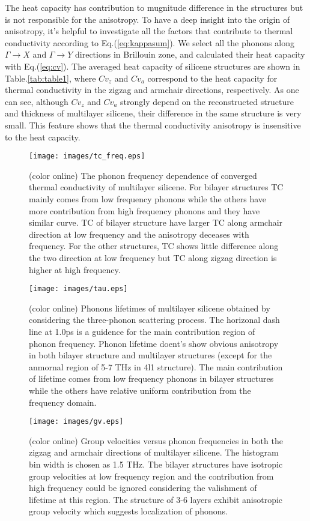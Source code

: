 \documentclass[aps,prb,twocolumn,showpacs,amsmath,amssymb]{revtex4-1}
\begin{document}
The heat capacity has contribution to mugnitude difference in the structures but is not responsible for the anisotropy. To have a deep insight into the origin of anisotropy, it's helpful to investigate all the factors that contribute to thermal conductivity according to Eq.(\ref{eq:kappasum}).
We select all the phonons along  $\Gamma\rightarrow X$ and $\Gamma \rightarrow Y$ directions in Brillouin zone, and calculated their heat capacity with Eq.(\ref{eq:cv}). The averaged heat capacity of silicene structures are shown in Table.\ref{tab:table1}, where $Cv_z$ and $Cv_a$ correspond to the  heat capacity for thermal conductivity in the zigzag and armchair directions, respectively.  As one can see, although $Cv_z$ and $Cv_a$  strongly depend on the reconstructed structure and thickness of multilayer silicene, their difference in the same structure is very small. This feature shows that the thermal conductivity anisotropy is insensitive to the heat capacity.


\begin{figure}[b]
  \texttt{[image: images/tc\_freq.eps]}
  \caption{\label{fig:tc_freq} (color online)  The phonon frequency dependence of converged thermal conductivity of multilayer silicene. For bilayer structures TC mainly comes from low frequency phonons while the others have more contribution from high frequency phonons and they have similar curve. TC of bilayer structure have larger TC along armchair direction at low frequency and the anisotropy deceases with frequency. For the other structures, TC shows little difference along the two direction at low frequency but TC along zigzag direction is higher at high frequency. }
\end{figure}

\begin{figure}[b]
  \texttt{[image: images/tau.eps]}
  \caption{\label{fig:tau} (color online)  Phonons lifetimes of multilayer silicene obtained by considering the three-phonon scattering process.  The horizonal dash line at 1.0ps is a guidence for the main contribution region of phonon frequency. Phonon lifetime doent's show obvious anisotropy in both bilayer structure and multilayer structures (except for the anmornal region of 5-7 THz in 4l1 structure). The main contribution of lifetime comes from low frequency phonons in bilayer structures while the others have relative uniform contribution from the frequency domain.  }
\end{figure}

\begin{figure}[b]
  \texttt{[image: images/gv.eps]}{}
  \caption{\label{fig:gv} (color online) Group velocities versus phonon frequencies in both the zigzag and armchair directions of multilayer silicene. The histogram bin width is chosen as 1.5 THz. The bilayer structures have isotropic group velocities at low frequency region and the contribution from high frequency could be ignored considering the valishment of lifetime at this region. The structure of 3-6 layers exhibit anisotropic group velocity which suggests localization of phonons.}
\end{figure}
\end{document}
